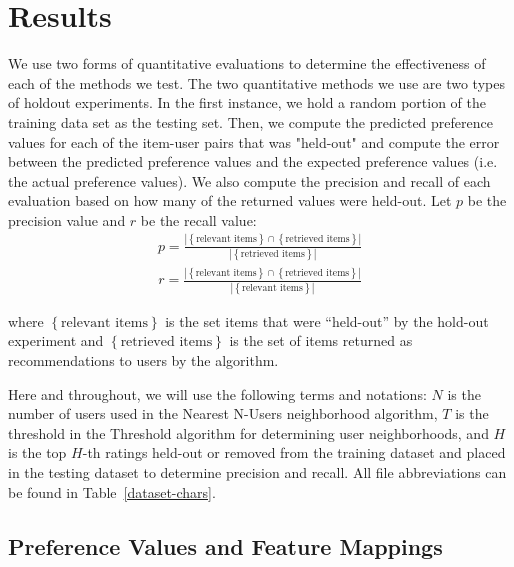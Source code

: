 \documentclass{article}
\begin{document}
\section{Results}\label{sec:results}

We use two forms of quantitative evaluations to determine the effectiveness of each of the methods we test.
The two quantitative methods we use are two types of holdout experiments.
In the first instance, we hold a random portion of the training data set as the testing set. Then, we compute the 
predicted preference values for each of the item-user pairs that was "held-out" and compute the error between
the predicted preference values and the expected preference values (i.e. the actual preference values). We
also compute the precision and recall of each evaluation based on how many of the returned values
were held-out. Let $p$ be the precision value and $r$ be the recall value:\begin{align*}
p = \frac{|\left\{ \text{relevant items} \right\} \cap \left\{\text{retrieved items}\right\}|}{|\left\{\text{retrieved items}\right\}|}
\end{align*}
\begin{align*}
r = \frac{|\left\{ \text{relevant items} \right\} \cap \left\{\text{retrieved items}\right\}|}{|\left\{\text{relevant items}\right\}|}
\end{align*} 

where $\left\{\text{relevant items}\right\}$ is the set items that were ``held-out'' by the hold-out experiment and $\left\{\text{retrieved items}\right\}$ is the set of items returned as recommendations to users by the algorithm.

Here and throughout, we will use the following terms and notations: $N$ is the number of users 
used in the Nearest N-Users neighborhood algorithm, $T$ is the threshold in the 
Threshold algorithm for determining user neighborhoods, and $H$ is the top $H$-th 
ratings held-out or removed from the training dataset and placed in the testing dataset
to determine precision and recall. All file abbreviations can be found in Table~\ref{dataset-chars}.

\subsection{Preference Values and Feature Mappings}
\end{document}
